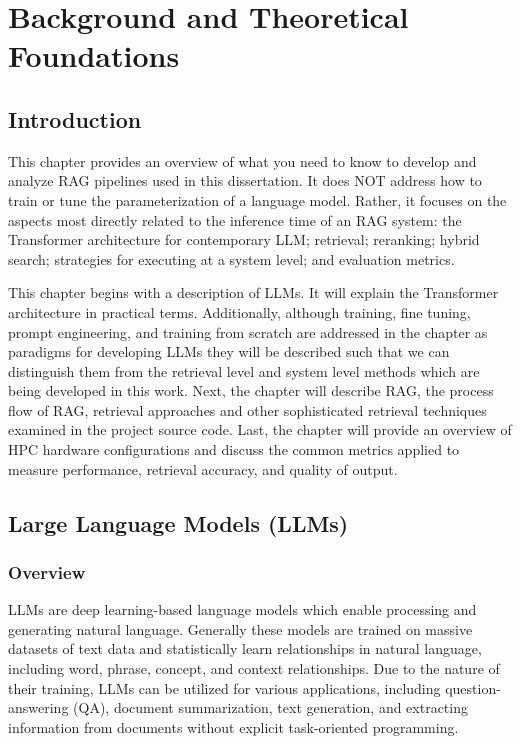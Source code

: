 \chapter{Background and Theoretical Foundations}

\section{Introduction}

This chapter provides an overview of what you need to know to develop and analyze \ac{RAG} pipelines used in this dissertation. It does NOT address how to train or tune the parameterization of a language model. Rather, it focuses on the aspects most directly related to the inference time of an \ac{RAG} system: the Transformer architecture for contemporary \ac{LLM}; retrieval; reranking; hybrid search; strategies for executing at a system level; and evaluation metrics.

This chapter begins with a description of \acp{LLM}. It will explain the Transformer architecture in practical terms. Additionally, although training, fine tuning, prompt engineering, and training from scratch are addressed in the chapter as paradigms for developing \acp{LLM} they will be described such that we can distinguish them from the retrieval level and system level methods which are being developed in this work. Next, the chapter will describe \ac{RAG}, the process flow of \ac{RAG}, retrieval approaches and other sophisticated retrieval techniques examined in the project source code. Last, the chapter will provide an overview of \ac{HPC} hardware configurations and discuss the common metrics applied to measure performance, retrieval accuracy, and quality of output.

\section{Large Language Models (LLMs)}

\subsection{Overview}

\acp{LLM} are deep learning-based language models which enable processing and generating natural language. Generally these models are trained on massive datasets of text data and statistically learn relationships in natural language, including word, phrase, concept, and context relationships. Due to the nature of their training, \acp{LLM} can be utilized for various applications, including question-answering (QA), document summarization, text generation, and extracting information from documents without explicit task-oriented programming.

